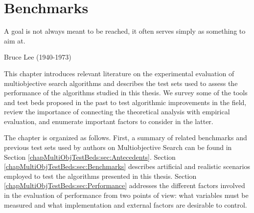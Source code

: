 %
%
%
%
%
%

\chapter{Benchmarks}
\label{chapMultiObjTestBeds}
%
\begin{FraseCelebre}
\begin{Frase}
A goal is not always meant to be reached, it often serves simply as something to aim at.
\end{Frase}
\begin{Fuente}
Bruce Lee (1940-1973)
\end{Fuente}
\end{FraseCelebre}

This chapter introduces relevant literature on the experimental evaluation of multiobjective search algorithms and describes the test sets used to assess the performance of the algorithms studied in this thesis. We survey some of the tools and test beds proposed in the past to test algorithmic improvements in the field, review the importance of connecting the theoretical analysis with empirical evaluation, and enumerate important factors to consider in the latter.

The chapter is organized as follows. First, a summary of related benchmarks and previous test sets used by authors on Multiobjective Search can be found in Section \ref{chapMultiObjTestBeds:sec:Antecedents}. Section \ref{chapMultiObjTestBeds:sec:Benchmarks} describes artificial and realistic scenarios employed to test the algorithms presented in this thesis. Section \ref{chapMultiObjTestBeds:sec:Performance} addresses the different factors involved in the evaluation of performance from two points of view: what variables must be measured and what implementation and external factors are desirable to control.
 
